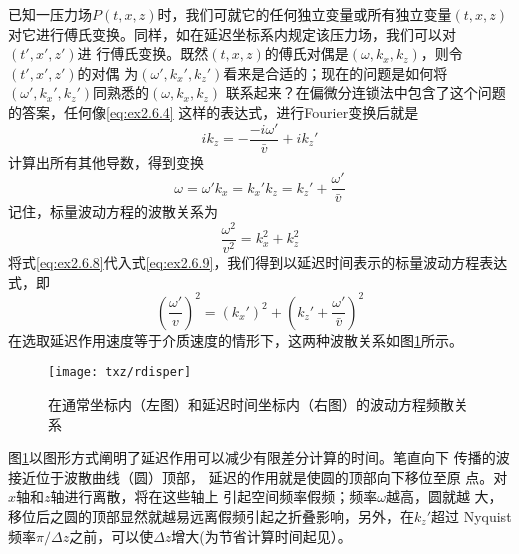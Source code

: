 已知一压力场$P(t,x,z)$时，我们可就它的任何独立变量或所有独立变量$(t,x,z)$
对它进行傅氏变换。同样，如在延迟坐标系内规定该压力场，我们可以对$(t',x',z')$进
行傅氏变换。既然$(t,x,z)$的傅氏对偶是$(\omega,k_x,k_z)$，则令$(t',x',z')$的对偶
为$(\omega',k_x',k_z')$看来是合适的；现在的问题是如何将$(\omega',k_x',k_z')$同熟悉的$(\omega,k_x,k_z)$
联系起来？在偏微分连锁法中包含了这个问题的答案，任何像\ref{eq:ex2.6.4}
这样的表达式，进行Fourier变换后就是
\begin{equation}
ik_z=-\frac{-i\omega'}{\bar{v}}+ik_z'
\label{eq:ex2.6.7}
\end{equation}
计算出所有其他导数，得到变换
\begin{subequations}
\begin{equation}
\omega = \omega '
\label{eq:ex2.6.8a}
\end{equation}
\begin{equation}
k_x=k_x'
\label{eq:ex2.6.8b}
\end{equation}
\begin{equation}
k_z=k_z'+\frac{\omega'}{\bar{v}}
\label{eq:ex2.6.8c}
\end{equation}
\label{eq:ex2.6.8}
\end{subequations}
记住，标量波动方程的波散关系为
\begin{equation}
\frac{\omega^2}{v^2}=k_x^2+k_z^2
\label{eq:ex2.6.9}
\end{equation}
将式\ref{eq:ex2.6.8}代入式\ref{eq:ex2.6.9}，我们得到以延迟时间表示的标量波动方程表达式，即
\begin{equation}
(\frac{\omega'}{v})^2=(k_x')^2+(k_z'+\frac{\omega'}{\bar{v}})^2
\label{eq:ex2.6.10}
\end{equation}
在选取延迟作用速度等于介质速度的情形下，这两种波散关系如图\ref{fig:txz/rdisper}所示。
\begin{figure}[H]
\centering
\texttt{[image: txz/rdisper]}
\caption[rdisper]{在通常坐标内（左图）和延迟时间坐标内（右图）的波动方程频散关系}
\label{fig:txz/rdisper}
\end{figure}
图\ref{fig:txz/rdisper}以图形方式阐明了延迟作用可以减少有限差分计算的时间。笔直向下
传播的波接近位于波散曲线（圆）顶部，
延迟的作用就是使圆的顶部向下移位至原
点。对$x$轴和$z$轴进行离散，将在这些轴上
引起空间频率假频；频率$\omega$越高，圆就越
大，移位后之圆的顶部显然就越易远离假频引起之折叠影响，另外，在$k_z'$超过
Nyquist频率$\pi/\Delta z$之前，可以使$\Delta z$增大(为节省计算时间起见）。

